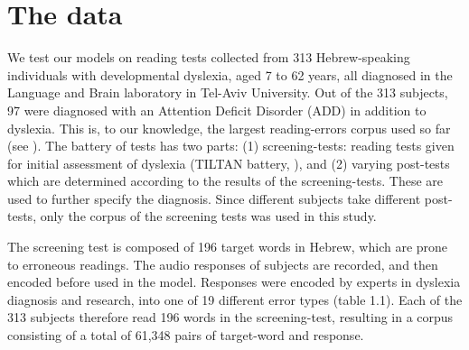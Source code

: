 \section{The data}
We test our models on reading tests collected from 313 Hebrew-speaking individuals with developmental dyslexia, aged 7 to 62 years, all diagnosed in the Language and Brain laboratory in Tel-Aviv University. Out of the 313 subjects, 97 were diagnosed with an Attention Deficit Disorder (ADD) in addition to dyslexia. This is, to our knowledge, the largest reading-errors corpus used so far (see \citealp{p07, rbl14}). The battery of tests has two parts: (1) screening-tests: reading tests given for initial assessment of dyslexia (TILTAN battery, \citealp{fg03}), and (2) varying post-tests which are determined according to the results of the screening-tests. These are used to further specify the diagnosis. Since different subjects take different post-tests, only the corpus of the screening tests was used in this study.

The screening test is composed of 196 target words in Hebrew, which are prone to erroneous readings. The audio responses of subjects are recorded, and then encoded before used in the model. Responses were encoded by experts in dyslexia diagnosis and research, into one of 19 different error types (table 1.1). Each of the 313 subjects therefore read 196 words in the screening-test, resulting in a corpus consisting of a total of 61,348 pairs of target-word and response.

